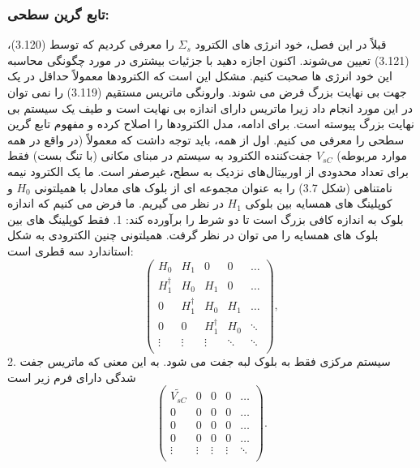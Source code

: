 \subsubsection{تابع گرین سطحی:}
قبلاً در این فصل، خود انرژی های الکترود $\Sigma_{s}$ را معرفی کردیم که توسط (3.120)، (3.121) تعیین می‌شوند. اکنون اجازه دهید با جزئیات بیشتری در مورد چگونگی محاسبه این خود انرژی ها صحبت کنیم. مشکل این است که الکترودها معمولاً حداقل در یک جهت بی نهایت بزرگ فرض می شوند. وارونگی ماتریس مستقیم (3.119) را نمی توان در این مورد انجام داد زیرا ماتریس دارای اندازه بی نهایت است و طیف یک سیستم بی نهایت بزرگ پیوسته است.
برای ادامه، مدل الکترودها را اصلاح کرده و مفهوم تابع گرین سطحی را معرفی می کنیم. اول از همه، باید توجه داشت که معمولاً (در واقع در همه موارد مربوطه) $V_{sC}$ جفت‌کننده الکترود به سیستم در مبنای مکانی (با تنگ بست) فقط برای تعداد محدودی از اوربیتال‌های نزدیک به سطح، غیرصفر است. ما یک الکترود نیمه نامتناهی (شکل 3.7) را به عنوان مجموعه ای از بلوک های معادل با همیلتونی $H_0$ و کوپلینگ های همسایه بین بلوکی $H_1$ در نظر می گیریم. ما فرض می کنیم که اندازه بلوک به اندازه کافی بزرگ است تا دو شرط را برآورده کند:
1.	 فقط کوپلینگ های بین بلوک های همسایه را می توان در نظر گرفت. همیلتونی چنین الکترودی به شکل استاندارد سه قطری است:
\begin{equation}
    \left( \begin{matrix}
           {{H}_{0}} & {{H}_{1}} & 0 & 0 & \ldots   \\
           H_{1}^{\dagger } & {{H}_{0}} & {{H}_{1}} & 0 & \ldots   \\
           0 & H_{1}^{\dagger } & {{H}_{0}} & {{H}_{1}} & \ldots   \\
           0 & 0 & H_{1}^{\dagger } & {{H}_{0}} & \ddots   \\
           \vdots  & \vdots  & \vdots  & \ddots  & \ddots   \\
        \end{matrix} \right),
\end{equation}
2.	سیستم مرکزی فقط به بلوک لبه جفت می شود. به این معنی که ماتریس جفت شدگی دارای فرم زیر است
\begin{equation}
    \left( 
        \begin{matrix}
           \widetilde{{{V}_{sC}}} & 0 & 0 & 0 & \ldots   \\
           0 & 0 & 0 & 0 & \ldots   \\
           0 & 0 & 0 & 0 & \ldots   \\
           0 & 0 & 0 & 0 & \ldots   \\
           \vdots  & \vdots  & \vdots  & \vdots  & \ddots   \\
        \end{matrix} 
    \right).
\end{equation}
